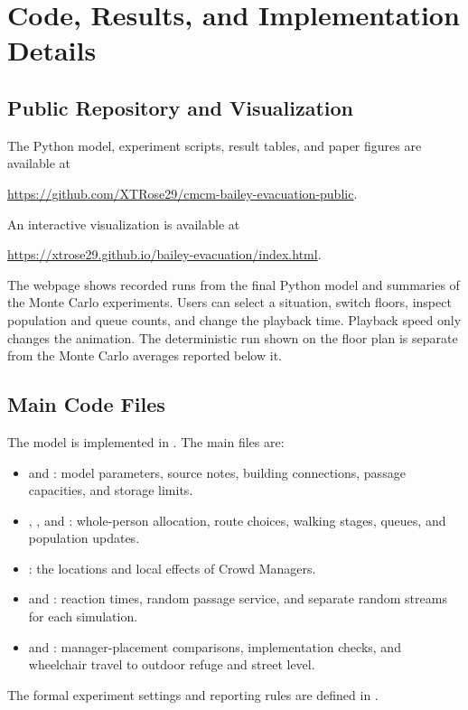 \section{Code, Results, and Implementation Details}
\label{app:implementation}

\subsection{Public Repository and Visualization}

The Python model, experiment scripts, result tables, and paper figures are available at
\begin{center}
\url{https://github.com/XTRose29/cmcm-bailey-evacuation-public}.
\end{center}
An interactive visualization is available at
\begin{center}
\url{https://xtrose29.github.io/bailey-evacuation/index.html}.
\end{center}
The webpage shows recorded runs from the final Python model and summaries of the Monte Carlo experiments. Users can select a situation, switch floors, inspect population and queue counts, and change the playback time. Playback speed only changes the animation. The deterministic run shown on the floor plan is separate from the Monte Carlo averages reported below it.

\subsection{Main Code Files}

The model is implemented in . The main files are:
\begin{itemize}
    \item {} and : model parameters, source notes, building connections, passage capacities, and storage limits.
    \item {}, , and : whole-person allocation, route choices, walking stages, queues, and population updates.
    \item {}: the locations and local effects of Crowd Managers.
    \item {} and : reaction times, random passage service, and separate random streams for each simulation.
    \item {} and : manager-placement comparisons, implementation checks, and wheelchair travel to outdoor refuge and street level.
\end{itemize}
The formal experiment settings and reporting rules are defined in .

